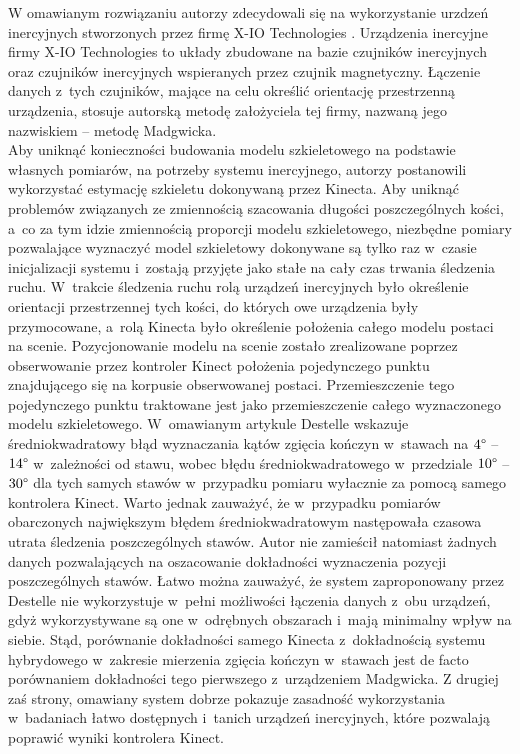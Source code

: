 W omawianym rozwiązaniu autorzy zdecydowali się na wykorzystanie urzdzeń inercyjnych stworzonych przez firmę X-IO Technologies \cite{xIo}. Urządzenia inercyjne firmy X-IO Technologies to układy zbudowane na bazie czujników inercyjnych oraz czujników inercyjnych wspieranych przez czujnik magnetyczny. Łączenie danych z~tych czujników, mające na celu określić orientację przestrzenną urządzenia, stosuje autorską metodę założyciela tej firmy, nazwaną jego nazwiskiem -- metodę Madgwicka.\\
Aby uniknąć konieczności budowania modelu szkieletowego na podstawie własnych pomiarów, na potrzeby systemu inercyjnego, autorzy postanowili wykorzystać estymację szkieletu dokonywaną przez Kinecta. Aby uniknąć problemów związanych ze zmiennością szacowania długości poszczególnych kości, a~co za tym idzie zmiennością proporcji modelu szkieletowego, niezbędne pomiary pozwalające wyznaczyć model szkieletowy dokonywane są tylko raz w~czasie inicjalizacji systemu i~zostają przyjęte jako stałe na cały czas trwania śledzenia ruchu. W~trakcie śledzenia ruchu rolą urządzeń inercyjnych było określenie orientacji przestrzennej tych kości, do których owe urządzenia były przymocowane, a~rolą Kinecta było określenie położenia całego modelu postaci na scenie. Pozycjonowanie modelu na scenie zostało zrealizowane poprzez obserwowanie przez kontroler Kinect położenia pojedynczego punktu znajdującego się na korpusie obserwowanej postaci. Przemieszczenie tego pojedynczego punktu traktowane jest jako przemieszczenie całego wyznaczonego modelu szkieletowego. W~omawianym artykule Destelle wskazuje średniokwadratowy błąd wyznaczania kątów zgięcia kończyn w~stawach na $4\degree$ -- $14\degree$ w~zależności od stawu, wobec błędu średniokwadratowego w~przedziale $10\degree$ -- $30\degree$ dla tych samych stawów w~przypadku pomiaru wyłacznie za pomocą samego kontrolera Kinect. Warto jednak zauważyć, że w~przypadku pomiarów obarczonych największym błędem średniokwadratowym następowała czasowa utrata śledzenia poszczególnych stawów. Autor nie zamieścił natomiast żadnych danych pozwalających na oszacowanie dokładności wyznaczenia pozycji poszczególnych stawów. Łatwo można zauważyć, że system zaproponowany przez Destelle nie wykorzystuje w~pełni możliwości łączenia danych z~obu urządzeń, gdyż wykorzystywane są one w~odrębnych obszarach i~mają minimalny wpływ na siebie. Stąd, porównanie dokładności samego Kinecta z~dokładnością systemu hybrydowego w~zakresie mierzenia zgięcia kończyn w~stawach jest de facto porównaniem dokładności tego pierwszego z~urządzeniem Madgwicka. Z drugiej zaś strony, omawiany system dobrze pokazuje zasadność wykorzystania w~badaniach łatwo dostępnych i~tanich urządzeń inercyjnych, które pozwalają poprawić wyniki kontrolera Kinect.\\
		
